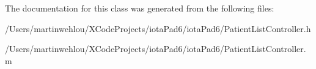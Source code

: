 The documentation for this class was generated from the following files:\begin{DoxyCompactItemize}
\item 
/Users/martinwehlou/XCodeProjects/iotaPad6/iotaPad6/PatientListController.h\item 
/Users/martinwehlou/XCodeProjects/iotaPad6/iotaPad6/PatientListController.m\end{DoxyCompactItemize}
